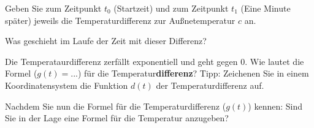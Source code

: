 \begin{bbwAufgabenBlock}

\item Geben Sie zum Zeitpunkt $t_0$ (Startzeit) und zum Zeitpunkt
  $t_1$ (Eine Minute später) jeweils die Temperaturdifferenz zur
  Außnetemperatur $c$ an.


\item Was geschieht im Laufe der Zeit mit dieser Differenz?


\item Die Temperataurdifferenz zerfällt exponentiell und geht gegen 0.
  Wie lautet die Formel ($g(t)=...$) für die Temperatur\textbf{differenz}? Tipp:
  Zeichenen Sie in einem Koordinatensystem die Funktion $d(t)$ der
  Temperaturdifferenz auf.


\item Nachdem Sie nun die Formel für die Temperaturdifferenz ($g(t)$) kennen:
  Sind Sie in der Lage eine Formel für die Temperatur anzugeben?

  

\end{bbwAufgabenBlock}


\platzFuerBerechnungenBisEndeSeite{}

